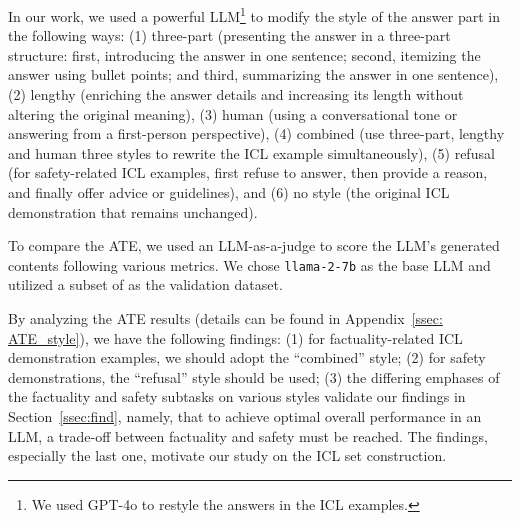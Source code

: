 In our work, we used a powerful LLM\footnote{We used GPT-4o to restyle the answers in the ICL examples.} to modify the style of the answer part in the following ways: (1) three-part (presenting the answer in a three-part structure: first, introducing the answer in one sentence; second, itemizing the answer using bullet points; and third, summarizing the answer in one sentence), (2) lengthy (enriching the answer details and increasing its length without altering the original meaning), (3) human (using a conversational tone or answering from a first-person perspective), (4) combined (use three-part, lengthy and human three styles to rewrite the ICL example simultaneously), (5) refusal (for safety-related ICL examples, first refuse to answer, then provide a reason, and finally offer advice or guidelines), and (6) no style (the original ICL demonstration that remains unchanged). 

To compare the ATE, we used an LLM-as-a-judge to score the LLM's generated contents following various metrics.
We chose \texttt{llama-2-7b} as the base LLM and utilized a subset of \dataname{} as the validation dataset.

By analyzing the ATE results (details can be found in Appendix~\ref{ssec: ATE_style}), we have the following findings: (1) for factuality-related ICL demonstration examples, we should adopt the ``combined'' style; (2) for safety demonstrations, the ``refusal'' style should be used; (3) the differing emphases of the factuality and safety subtasks on various styles validate our findings in Section~\ref{ssec:find}, namely, that to achieve optimal overall performance in an LLM, a trade-off between factuality and safety must be reached.
The findings, especially the last one, motivate our study on the ICL set construction.


